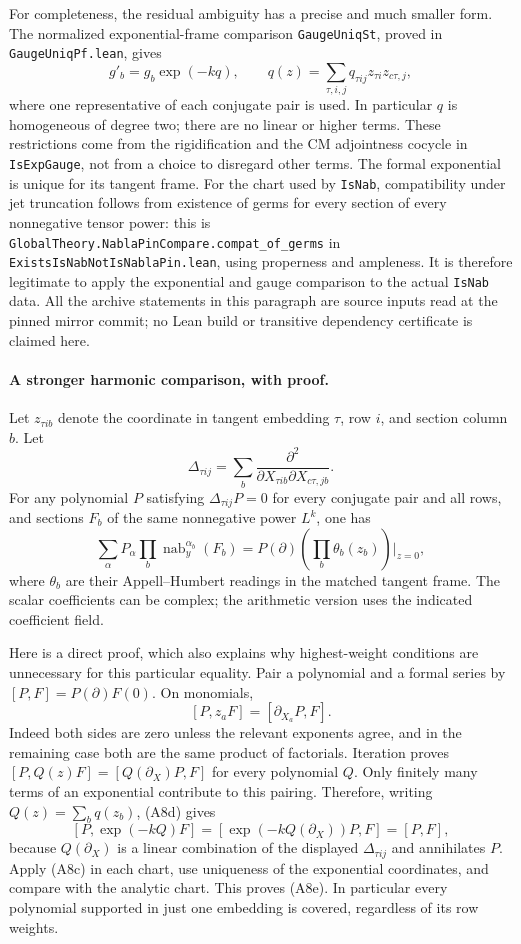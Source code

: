 \documentclass[11pt]{article}
\theoremstyle{definition}\newtheorem{definition}[theorem]{Definition}\newtheorem{remark}[theorem]{Remark}
\begin{document}
For completeness, the residual ambiguity has a precise and much
smaller form.  The normalized exponential-frame comparison
\texttt{GaugeUniqSt}, proved in \texttt{GaugeUniqPf.lean}, gives
\[
       g'_b=g_b\exp(-kq),\qquad
 q(z)=\sum_{\tau,i,j}q_{\tau ij}z_{\tau i}z_{c\tau,j},
 \tag{A8d}
\]
where one representative of each conjugate pair is used.
In particular $q$ is homogeneous of degree two; there are no
linear or higher terms.  These restrictions come from the
rigidification and the CM adjointness cocycle in
\texttt{IsExpGauge}, not from a choice to disregard other terms.
The formal exponential is unique for its tangent frame.
For the chart used by \texttt{IsNab}, compatibility under jet
truncation follows from existence of germs for every section of
every nonnegative tensor power: this is
\nolinkurl{GlobalTheory.NablaPinCompare.compat_of_germs} in
\nolinkurl{ExistsIsNabNotIsNablaPin.lean}, using properness and
ampleness.  It is therefore legitimate to apply the exponential
and gauge comparison to the actual \texttt{IsNab} data.  All the
archive statements in this paragraph are source inputs read at
the pinned mirror commit; no Lean build or transitive dependency
certificate is claimed here.

\paragraph{A stronger harmonic comparison, with proof.}
Let $z_{\tau i b}$ denote the coordinate in tangent embedding
$\tau$, row $i$, and section column $b$.  Let
\[
 \Delta_{\tau ij}
     =\sum_b
       \frac{\partial^2}
       {\partial X_{\tau i b}\partial X_{c\tau,jb}}.
\]
For any polynomial $P$ satisfying
$\Delta_{\tau ij}P=0$ for every conjugate pair and all rows, and
sections $F_b$ of the same nonnegative power $L^k$, one has
\[
 \sum_\alpha P_\alpha
      \prod_b\operatorname{nab}_y^{\alpha_b}(F_b)
   =P(\partial)\left(\prod_b\theta_b(z_b)\right)\bigg|_{z=0},
 \tag{A8e}
\]
where $\theta_b$ are their Appell--Humbert readings in the matched
tangent frame.  The scalar coefficients can be complex; the
arithmetic version uses the indicated coefficient field.

Here is a direct proof, which also explains why highest-weight
conditions are unnecessary for this particular equality.  Pair a
polynomial and a formal series by
$[P,F]=P(\partial)F(0)$.  On monomials,
\[
       [P,z_aF]=[\partial_{X_a}P,F].
\]
Indeed both sides are zero unless the relevant exponents agree,
and in the remaining case both are the same product of
factorials.  Iteration proves
$[P,Q(z)F]=[Q(\partial_X)P,F]$ for every polynomial $Q$.
Only finitely many terms of an exponential contribute to this
pairing.  Therefore, writing $Q(z)=\sum_b q(z_b)$, (A8d) gives
\[
 [P,\exp(-kQ)F]
      =[\exp(-kQ(\partial_X))P,F]=[P,F],
\]
because $Q(\partial_X)$ is a linear combination of the displayed
$\Delta_{\tau ij}$ and annihilates $P$.  Apply (A8c) in each
chart, use uniqueness of the exponential coordinates, and compare
with the analytic chart.  This proves (A8e).  In particular every
polynomial supported in just one embedding is covered, regardless
of its row weights.
\end{document}
